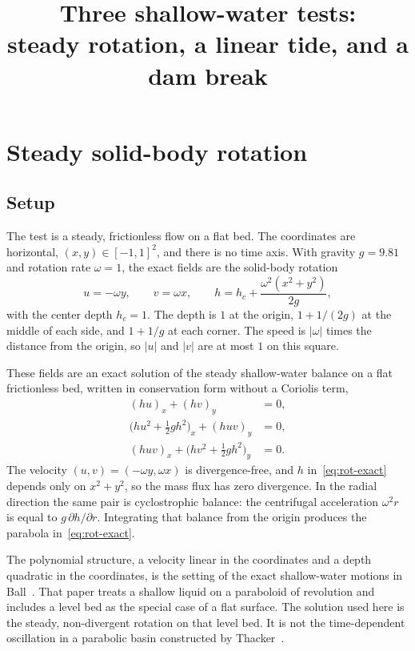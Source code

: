 \documentclass[11pt]{article}
\title{Three shallow-water tests:\\
steady rotation, a linear tide, and a dam break}
\author{}
\date{}
\begin{document}
\maketitle

\section{Steady solid-body rotation}
\label{sec:rotation}

\subsection{Setup}
\label{sec:rotation-setup}

The test is a steady, frictionless flow on a flat bed. The coordinates are horizontal, \((x,y)\in[-1,1]^{2}\), and there is no time axis. With gravity \(g=9.81\) and rotation rate \(\omega=1\), the exact fields are the solid-body rotation
\begin{equation}
\label{eq:rot-exact}
u=-\omega y,
\qquad
v=\omega x,
\qquad
h=h_{c}+\frac{\omega^{2}(x^{2}+y^{2})}{2g},
\end{equation}
with the center depth \(h_{c}=1\). The depth is \(1\) at the origin, \(1+1/(2g)\) at the middle of each side, and \(1+1/g\) at each corner. The speed is \(|\omega|\) times the distance from the origin, so \(|u|\) and \(|v|\) are at most \(1\) on this square.

These fields are an exact solution of the steady shallow-water balance on a flat frictionless bed, written in conservation form without a Coriolis term,
\begin{align}
\label{eq:swe}
(hu)_{x}+(hv)_{y}&=0,\\
\big(hu^{2}+\tfrac12 g h^{2}\big)_{x}+(huv)_{y}&=0,\\
(huv)_{x}+\big(hv^{2}+\tfrac12 g h^{2}\big)_{y}&=0.
\end{align}
The velocity \((u,v)=(-\omega y,\omega x)\) is divergence-free, and \(h\) in~\eqref{eq:rot-exact} depends only on \(x^{2}+y^{2}\), so the mass flux has zero divergence. In the radial direction the same pair is cyclostrophic balance: the centrifugal acceleration \(\omega^{2} r\) is equal to \(g\,\partial h/\partial r\). Integrating that balance from the origin produces the parabola in~\eqref{eq:rot-exact}.

The polynomial structure, a velocity linear in the coordinates and a depth quadratic in the coordinates, is the setting of the exact shallow-water motions in Ball~\cite{ball1963}. That paper treats a shallow liquid on a paraboloid of revolution and includes a level bed as the special case of a flat surface. The solution used here is the steady, non-divergent rotation on that level bed. It is not the time-dependent oscillation in a parabolic basin constructed by Thacker~\cite{thacker1981}.
\end{document}
